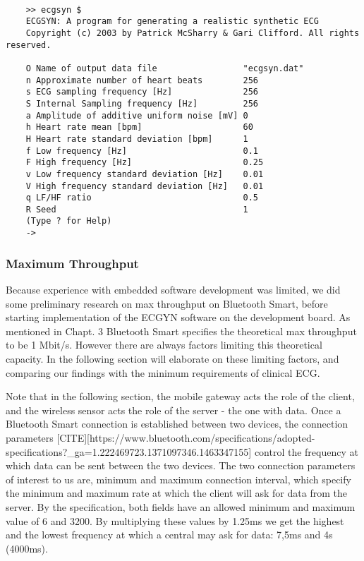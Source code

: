 \begin{lstlisting}[caption={ECGSYN menu}, label={lst:ECGSYN}]

    >> ecgsyn $
    ECGSYN: A program for generating a realistic synthetic ECG
    Copyright (c) 2003 by Patrick McSharry & Gari Clifford. All rights reserved.
     
    O Name of output data file                 "ecgsyn.dat"
    n Approximate number of heart beats        256
    s ECG sampling frequency [Hz]              256
    S Internal Sampling frequency [Hz]         256
    a Amplitude of additive uniform noise [mV] 0
    h Heart rate mean [bpm]                    60
    H Heart rate standard deviation [bpm]      1
    f Low frequency [Hz]                       0.1
    F High frequency [Hz]                      0.25
    v Low frequency standard deviation [Hz]    0.01
    V High frequency standard deviation [Hz]   0.01
    q LF/HF ratio                              0.5
    R Seed                                     1
    (Type ? for Help)
    ->

\end{lstlisting}

\subsubsection{Maximum Throughput} %
\label{ssub:maximum_throughput}

Because experience with embedded software development was limited, we did some preliminary research on max throughput on Bluetooth Smart, before starting implementation of the ECGYN software on the development board. As mentioned in Chapt. 3 Bluetooth Smart specifies the theoretical max throughput to be 1 Mbit/s. However there are always factors limiting this theoretical capacity. In the following section will elaborate on these limiting factors, and comparing our findings with the minimum requirements of clinical ECG.

Note that in the following section, the mobile gateway acts the role of the client, and the wireless sensor acts the role of the server - the one with data. Once a Bluetooth Smart connection is established between two devices, the connection parameters [CITE][https://www.bluetooth.com/specifications/adopted-specifications?_ga=1.222469723.1371097346.1463347155] control the frequency at which data can be sent between the two devices. The two connection parameters of interest to us are, minimum and maximum connection interval, which specify the minimum and maximum rate at which the client will ask for data from the server. By the specification, both fields have an allowed minimum and maximum value of 6 and 3200. By multiplying these values by 1.25ms we get the highest and the lowest frequency at which a central may ask for data: 7,5ms and 4s (4000ms).

